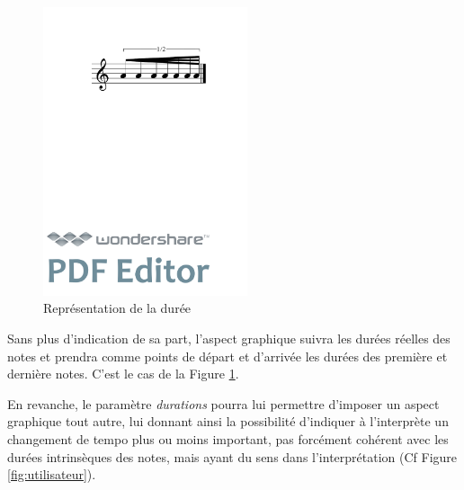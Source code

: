 \documentclass[a4paper,10pt,twocolumn]{article}
\newenvironment{code}
  {\fontfamily{pnc}\selectfont}{}
\begin{document}
\begin{figure}[h]
\centering
\begin{code}
[ \textbackslash{}fBeam\textless{}drawDuration="true"\textgreater{}

( a/8 a a/16 a a a/32 a ) ]
\end{code}
\includegraphics[width=6cm]{img/fbeamduree.pdf}
\caption{Représentation de la durée}
\label{fig:fbeamduree}
\end{figure}

Sans plus d'indication de sa part, l'aspect graphique suivra les durées réelles des notes et prendra comme points de départ et d'arrivée les durées des première et dernière notes.  C'est le cas de la Figure \ref{fig:fbeamduree}.

En revanche, le paramètre \textit{durations} pourra lui permettre d'imposer un aspect graphique tout autre, lui donnant ainsi la possibilité d'indiquer à l'interprète un changement de tempo plus ou moins important, pas forcément cohérent avec les durées intrinsèques des notes, mais ayant du sens dans l'interprétation (Cf Figure \ref{fig:utilisateur}).
\end{document}
